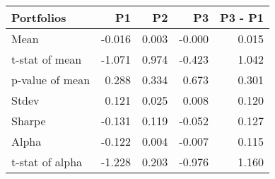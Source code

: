 \begin{tabular}{lrrrr}
\toprule
Portfolios & P1 & P2 & P3 & P3 - P1 \\
\midrule
Mean & -0.016 & 0.003 & -0.000 & 0.015 \\
t-stat of mean & -1.071 & 0.974 & -0.423 & 1.042 \\
p-value of mean & 0.288 & 0.334 & 0.673 & 0.301 \\
Stdev & 0.121 & 0.025 & 0.008 & 0.120 \\
Sharpe & -0.131 & 0.119 & -0.052 & 0.127 \\
Alpha & -0.122 & 0.004 & -0.007 & 0.115 \\
t-stat of alpha & -1.228 & 0.203 & -0.976 & 1.160 \\
\bottomrule
\end{tabular}
